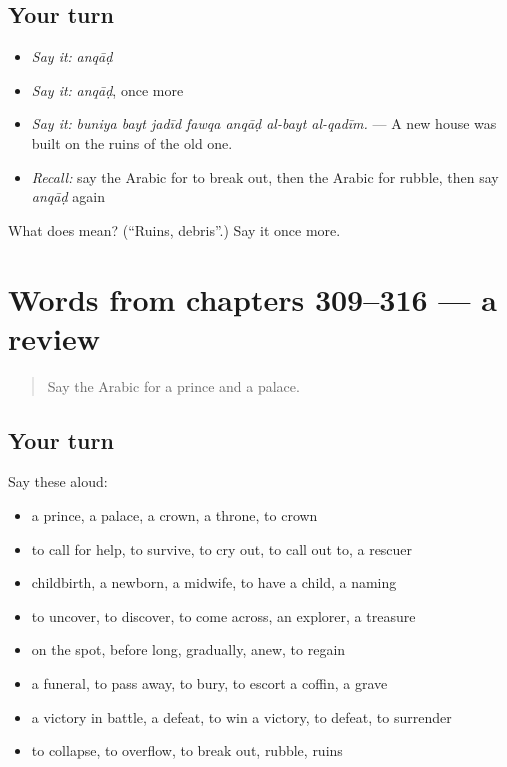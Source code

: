 \subsection*{Your turn}
\begin{itemize}
\raggedright
  \item \emph{Say it:} \emph{anqāḍ}
  \item \emph{Say it:} \emph{anqāḍ}, once more
  \item \emph{Say it:} \emph{buniya bayt jadīd fawqa anqāḍ al-bayt al-qadīm.} — A new house was built on the ruins of the old one.
  \item \emph{Recall:} say the Arabic for to break out, then the Arabic for rubble, then say \emph{anqāḍ} again
\end{itemize}

\begin{tcolorbox}[breakable,colback=teal!4,colframe=teal!35!black,title={Before you move on}]
What does  mean? (\textquotedblleft{}Ruins, debris\textquotedblright{}.) Say it once more.
\end{tcolorbox}
\section[(dialogue)]{Words from chapters 309–316 — a review}

\label{lesson:AR-R316-review-309-316}



\begin{quote}
Say the Arabic for a prince and a palace.
\end{quote}

\subsection*{Your turn}
Say these aloud:

\begin{itemize}
\raggedright
  \item a prince, a palace, a crown, a throne, to crown
  \item to call for help, to survive, to cry out, to call out to, a rescuer
  \item childbirth, a newborn, a midwife, to have a child, a naming
  \item to uncover, to discover, to come across, an explorer, a treasure
  \item on the spot, before long, gradually, anew, to regain
  \item a funeral, to pass away, to bury, to escort a coffin, a grave
  \item a victory in battle, a defeat, to win a victory, to defeat, to surrender
  \item to collapse, to overflow, to break out, rubble, ruins
\end{itemize}

